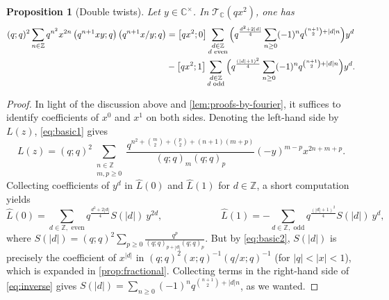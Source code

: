 \documentclass[reqno,11pt]{amsart}
\newtheorem{proposition}[theorem]{Proposition}
\theoremstyle{definition}
\theoremstyle{remark}
\numberwithin{equation}{section}
\newcommand{\Z}{\mathbb{Z}}
\newcommand{\C}{\mathbb{C}}
\newcommand{\mT}{\mathcal{T}}
\newcommand{\vect}[2]{\big[{#1};{#2}\big]}
\renewcommand{\hat}{\widehat}
\begin{document}
\begin{proposition}[Double twists] \label{prop:double-twist}
Let $y \in \C^\times$. In $\mT_\C\left(qx^2\right)$, one has
\[
\begin{aligned}
    (q; q)^2 \sum_{n \in \Z}
    q^{n^2} x^{2n} \left(q^{n+1} xy; q \right) \left(q^{n+1} x/y; q \right)
    &=
    \vect{qx^2}{0}\sum_{\substack{d \in \Z \\ d \textnormal{ even}}} \Big(q^{\frac{d^2 + 2|d|}{4}} \sum_{n \ge 0} (-1)^n q^{\binom{n+1}{2} + |d|n}\Big) y^d
    \\
    &- 
    \vect{qx^2}{1} \sum_{\substack{d \in \Z \\ d \textnormal{ odd}}} \Big(q^{\frac{(|d|+1)^2}{4}}  \sum_{n \ge 0} (-1)^n q^{\binom{n+1}{2} + |d|n}\Big) y^d.
\end{aligned}
\]
\end{proposition}

\begin{proof}
In light of the discussion above and \cref{lem:proofs-by-fourier}, it suffices to identify coefficients of $x^0$ and $x^1$ on both sides. Denoting the left-hand side by $L(z)$, \cref{eq:basic1} gives
\[
    L(z)
    =
    (q; q)^2
    \sum_{\substack{n \in \Z \\ m, p \ge 0}} \frac{q^{n^2 + \binom{m}{2} + \binom{p}{2} + (n+1)(m+p)}}{(q; q)_m (q; q)_p} (-y)^{m-p} x^{2n+m+p}.
\]
Collecting coefficients of $y^d$ in $\hat{L}(0)$ and $\hat{L}(1)$ for $d \in \Z$, a short computation yields
\[
    \hat{L}(0) 
    = 
    \sum_{d \in \Z, \text{ even}} q^{\frac{d^2 + 2|d|}{4}} S(|d|)\ y^{2d},
    \qquad\qquad\qquad
    \hat{L}(1)
    =
    -
    \sum_{d \in \Z, \text{ odd}} q^{\frac{\left(|d| + 1\right)^2}{4}} S(|d|)\ y^d,
\]
where $S(|d|) = (q; q)^2 \sum_{p \ge 0} \frac{q^p}{(q; q)_{p+|d|} (q; q)_p}$. But by \cref{eq:basic2}, $S(|d|)$ is precisely the coefficient of $x^{|d|}$ in $(q; q)^2 (x; q)^{-1} (q/x; q)^{-1}$ (for $|q| < |x| < 1$), which is expanded in \cref{prop:fractional}. Collecting terms in the right-hand side of \cref{eq:inverse} gives $S(|d|) = \sum_{n \ge 0} (-1)^n q^{\binom{n+1}{2} + |d|n}$, as we wanted.
\end{proof}
\end{document}

